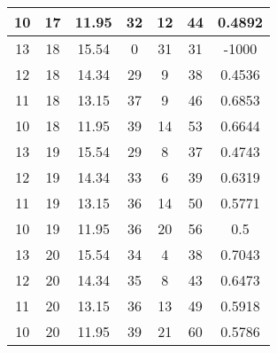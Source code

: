 \documentclass[letterpaper, 12pt]{article}
\begin{document}
\begin{longtable}{|c|c|c|c|c|c|c|}
\hline
10 & 17 & 11.95 & 32 & 12 & 44 & 0.4892 \\
\hline
13 & 18 & 15.54 & 0 & 31 & 31 & -1000 \\
\hline
12 & 18 & 14.34 & 29 & 9 & 38 & 0.4536 \\
\hline
11 & 18 & 13.15 & 37 & 9 & 46 & 0.6853 \\
\hline
10 & 18 & 11.95 & 39 & 14 & 53 & 0.6644 \\
\hline
13 & 19 & 15.54 & 29 & 8 & 37 & 0.4743 \\
\hline
12 & 19 & 14.34 & 33 & 6 & 39 & 0.6319 \\
\hline
11 & 19 & 13.15 & 36 & 14 & 50 & 0.5771 \\
\hline
10 & 19 & 11.95 & 36 & 20 & 56 & 0.5 \\
\hline
13 & 20 & 15.54 & 34 & 4 & 38 & 0.7043 \\
\hline
12 & 20 & 14.34 & 35 & 8 & 43 & 0.6473 \\
\hline
11 & 20 & 13.15 & 36 & 13 & 49 & 0.5918 \\
\hline
10 & 20 & 11.95 & 39 & 21 & 60 & 0.5786 \\
\hline
\end{longtable}
\end{document}
